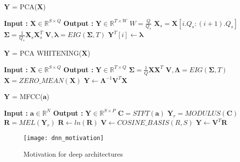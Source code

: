 \begin{algorithm}
  \caption{$\textbf{Y}$ = PCA($\textbf{X}$)}\label{PCA}
  \begin{algorithmic}[1]
    \Statex \textbf{Input :} $\textbf{X} \in \mathbb{R}^{S \times Q}$
    \Statex \textbf{Output :} $\textbf{Y} \in \mathbb{R}^{T \times W}$
    \State  $W = \frac{Q}{Q_{s}}$
    \State $\textbf{X}_{s} = \textbf{X}[i.Q_{s}:(i+1).Q_{s}]$ 
      \State $\bm{\Sigma} = \frac{1}{Q_{s}}\textbf{X}_{s}\textbf{X}_{s}^{T}$ 
      \State $\textbf{V}, \bm{\lambda} = EIG(\bm{\Sigma}, T)$ 
      \State $\textbf{Y}^{T}[i] \leftarrow \bm{\lambda}$
    \EndFor
  \end{algorithmic}
\end{algorithm}
\bigskip


\begin{algorithm}
  \caption{$\textbf{Y}$ = PCA WHITENING($\textbf{X}$) }\label{PCA_W}
  \begin{algorithmic}[1]
    \Statex \textbf{Input :} $\textbf{X} \in \mathbb{R}^{S \times Q}$
    \Statex \textbf{Output :} $\textbf{Y} \in \mathbb{R}^{T \times Q}$ 
      \State $\bm{\Sigma} = \frac{1}{Q}\textbf{X}\textbf{X}^{T}$ 
      \State $\textbf{V}, \bm{\Lambda} = EIG(\bm{\Sigma}, T)$ 
      \State $\textbf{\^{X}} = ZERO\_MEAN(\textbf{X})$
      \State $\textbf{Y} \leftarrow \bm{\Lambda}^{-1}\textbf{V}^{T}\textbf{\^{X}}$
  \end{algorithmic}
\end{algorithm}
\bigskip


\begin{algorithm}
  \caption{$\textbf{Y}$ = MFCC($\textbf{a}$) }\label{MFCC}
  \begin{algorithmic}[1]
    \Statex \textbf{Input :} $\textbf{a} \in \mathbb{R}^{N}$
    \Statex \textbf{Output :} $\textbf{Y} \in \mathbb{R}^{S \times P}$ 
    \State $\textbf{C} = STFT(\textbf{a})$ 
    \State $\textbf{Y}_{r} = MODULUS(\textbf{C})$ 
    \State $\textbf{R} = MEL(\textbf{Y}_{r})$ 
    \State $\textbf{R} \leftarrow ln(\textbf{R})$
    \State $\textbf{V} \leftarrow COSINE\_BASIS(R,S)$  
    \State $\textbf{Y} \leftarrow \textbf{V}^{T}\textbf{R}$
  \end{algorithmic}
\end{algorithm}
 
\begin{figure}[h] 
\centering
\texttt{[image: dnn\_motivation]}
\caption{Motivation for deep architectures}
 \label{fig:deep learning}
 \end{figure}
\FloatBarrier
\bigskip
